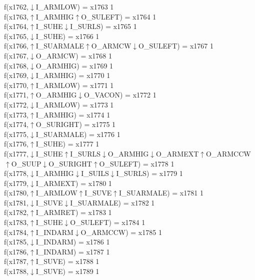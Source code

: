 f(x1762,$\downarrow$I\_ARMLOW) = x1763 {1} \\
f(x1763,$\uparrow$I\_ARMHIG$\uparrow$O\_SULEFT) = x1764 {1} \\
f(x1764,$\uparrow$I\_SUHE$\downarrow$I\_SURLS) = x1765 {1} \\
f(x1765,$\downarrow$I\_SUHE) = x1766 {1} \\
f(x1766,$\uparrow$I\_SUARMALE$\uparrow$O\_ARMCW$\downarrow$O\_SULEFT) = x1767 {1} \\
f(x1767,$\downarrow$O\_ARMCW) = x1768 {1} \\
f(x1768,$\downarrow$O\_ARMHIG) = x1769 {1} \\
f(x1769,$\downarrow$I\_ARMHIG) = x1770 {1} \\
f(x1770,$\uparrow$I\_ARMLOW) = x1771 {1} \\
f(x1771,$\uparrow$O\_ARMHIG$\downarrow$O\_VACON) = x1772 {1} \\
f(x1772,$\downarrow$I\_ARMLOW) = x1773 {1} \\
f(x1773,$\uparrow$I\_ARMHIG) = x1774 {1} \\
f(x1774,$\uparrow$O\_SURIGHT) = x1775 {1} \\
f(x1775,$\downarrow$I\_SUARMALE) = x1776 {1} \\
f(x1776,$\uparrow$I\_SUHE) = x1777 {1} \\
f(x1777,$\downarrow$I\_SUHE$\uparrow$I\_SURLS$\downarrow$O\_ARMHIG$\downarrow$O\_ARMEXT$\uparrow$O\_ARMCCW$\uparrow$O\_SUUP$\downarrow$O\_SURIGHT$\uparrow$O\_SULEFT) = x1778 {1} \\
f(x1778,$\downarrow$I\_ARMHIG$\downarrow$I\_SUILS$\downarrow$I\_SURLS) = x1779 {1} \\
f(x1779,$\downarrow$I\_ARMEXT) = x1780 {1} \\
f(x1780,$\uparrow$I\_ARMLOW$\uparrow$I\_SUVE$\uparrow$I\_SUARMALE) = x1781 {1} \\
f(x1781,$\downarrow$I\_SUVE$\downarrow$I\_SUARMALE) = x1782 {1} \\
f(x1782,$\uparrow$I\_ARMRET) = x1783 {1} \\
f(x1783,$\uparrow$I\_SUHE$\downarrow$O\_SULEFT) = x1784 {1} \\
f(x1784,$\uparrow$I\_INDARM$\downarrow$O\_ARMCCW) = x1785 {1} \\
f(x1785,$\downarrow$I\_INDARM) = x1786 {1} \\
f(x1786,$\uparrow$I\_INDARM) = x1787 {1} \\
f(x1787,$\uparrow$I\_SUVE) = x1788 {1} \\
f(x1788,$\downarrow$I\_SUVE) = x1789 {1} \\
